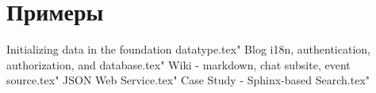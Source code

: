 
\part{Примеры}

 Initializing data in the foundation datatype.tex"
 Blog i18n, authentication, authorization, and database.tex"
 Wiki - markdown, chat subsite, event source.tex"
 JSON Web Service.tex"
 Case Study - Sphinx-based Search.tex"


